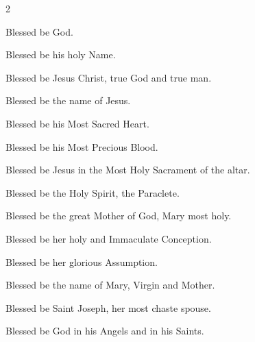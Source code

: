 \begin{multicols}{2}
\raggedcolumns
\begin{enpars}

Blessed be God. 

Blessed be his holy Name. 

Blessed be Jesus Christ, true God and true man.
 
Blessed be the name of Jesus.

Blessed be his Most Sacred Heart.

Blessed be his Most Precious Blood.

Blessed be Jesus in the Most Holy Sacrament of the altar.

Blessed be the Holy Spirit, the Paraclete.

Blessed be the great Mother of God, Mary most holy.

Blessed be her holy and Immaculate Conception.


Blessed be her glorious Assumption.

Blessed be the name of Mary, Virgin and Mother.

Blessed be Saint Joseph, her most chaste spouse.

Blessed be God in his Angels and in his Saints.

\end{enpars}
\end{multicols}